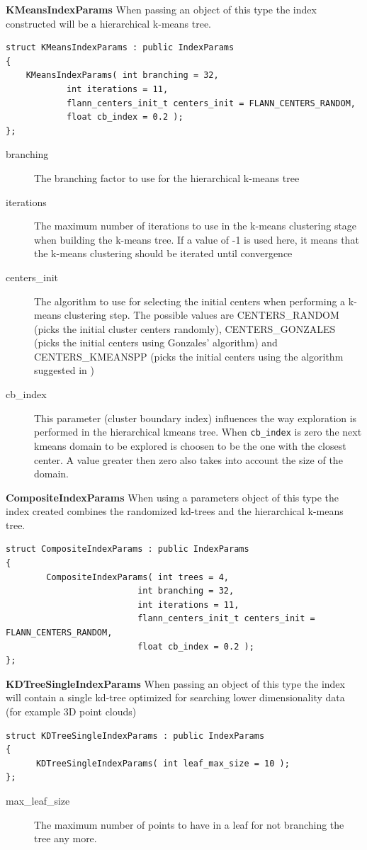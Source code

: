 \documentclass[letter,10pt]{article}
\begin{document}
\begin{description}
\textbf{KMeansIndexParams} When passing an object of this type the index constructed will be a hierarchical k-means tree. 
\begin{Verbatim}[fontsize=\footnotesize]
struct KMeansIndexParams : public IndexParams
{
	KMeansIndexParams( int branching = 32,
			int iterations = 11,
			flann_centers_init_t centers_init = FLANN_CENTERS_RANDOM,
			float cb_index = 0.2 );
};
\end{Verbatim}
\begin{description}
\item[branching]{ The branching factor to use for the hierarchical k-means tree }
\item[iterations]{ The maximum number of iterations to use in the k-means clustering 
		    stage when building the k-means tree. If a value of -1 is used here, it means
		    that the k-means clustering should be iterated until convergence}
\item[centers\_init]{ The algorithm to use for selecting the initial
		  centers when performing a k-means clustering step. The possible values are
		  CENTERS\_RANDOM (picks the initial cluster centers randomly), CENTERS\_GONZALES (picks the
		  initial centers using Gonzales' algorithm) and CENTERS\_KMEANSPP (picks the initial
		centers using the algorithm suggested in \cite{arthur_kmeanspp_2007}) }
\item[cb\_index]{ This parameter (cluster boundary index) influences the
		  way exploration is performed in the hierarchical kmeans tree. When \texttt{cb\_index} is zero
		  the next kmeans domain to be explored is choosen to be the one with the closest center. 
		  A value greater then zero also takes into account the size of the domain.}
\end{description}


\textbf{CompositeIndexParams} When using a parameters object of this type the index created combines the randomized
kd-trees 
        and the hierarchical k-means tree.
\begin{Verbatim}[fontsize=\footnotesize]
struct CompositeIndexParams : public IndexParams
{
        CompositeIndexParams( int trees = 4,
                          int branching = 32,
                          int iterations = 11,
                          flann_centers_init_t centers_init = FLANN_CENTERS_RANDOM, 
                          float cb_index = 0.2 );
};
\end{Verbatim}


\textbf{KDTreeSingleIndexParams} When passing an object of this type the index will contain a single kd-tree
optimized for searching lower dimensionality data (for example 3D point clouds)
\begin{Verbatim}[fontsize=\footnotesize]
struct KDTreeSingleIndexParams : public IndexParams
{
      KDTreeSingleIndexParams( int leaf_max_size = 10 );
};
\end{Verbatim}
\begin{description}
 \item[max\_leaf\_size] The maximum number of points to have in a leaf for not branching the tree any more.
\end{description}


\end{description}
\end{document}
